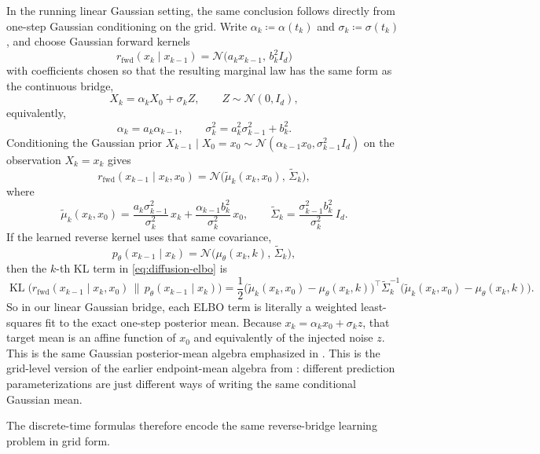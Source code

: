 In the running linear Gaussian setting, the same conclusion follows directly from one-step Gaussian conditioning on the grid.
Write \(\alpha_k\coloneqq \alpha(t_k)\) and \(\sigma_k\coloneqq \sigma(t_k)\), and choose Gaussian forward kernels
\[
  r_{\mathrm{fwd}}(x_k\mid x_{k-1})
  =
  \mathcal{N}\!\bigl(a_k x_{k-1},\,b_k^2 I_d\bigr)
\]
with coefficients chosen so that the resulting marginal law has the same form as the continuous bridge,
\[
  X_k=\alpha_k X_0+\sigma_k Z,
  \qquad
  Z\sim\mathcal{N}(0,I_d),
\]
equivalently,
\[
  \alpha_k=a_k\alpha_{k-1},
  \qquad
  \sigma_k^2=a_k^2\sigma_{k-1}^2+b_k^2.
\]
Conditioning the Gaussian prior \(X_{k-1}\mid X_0=x_0\sim \mathcal{N}(\alpha_{k-1}x_0,\sigma_{k-1}^2I_d)\) on the observation \(X_k=x_k\) gives
\[
  r_{\mathrm{fwd}}(x_{k-1}\mid x_k,x_0)
  =
  \mathcal{N}\!\bigl(\widetilde\mu_k(x_k,x_0),\,\widetilde\Sigma_k\bigr),
\]
where
\[
  \widetilde\mu_k(x_k,x_0)
  =
  \frac{a_k\sigma_{k-1}^2}{\sigma_k^2}\,x_k
  +
  \frac{\alpha_{k-1}b_k^2}{\sigma_k^2}\,x_0,
  \qquad
  \widetilde\Sigma_k
  =
  \frac{\sigma_{k-1}^2b_k^2}{\sigma_k^2}\,I_d.
\]
If the learned reverse kernel uses that same covariance,
\[
  p_\theta(x_{k-1}\mid x_k)
  =
  \mathcal{N}\!\bigl(\mu_\theta(x_k,k),\,\widetilde\Sigma_k\bigr),
\]
then the \(k\)-th KL term in \eqref{eq:diffusion-elbo} is
  \[
  \operatorname{KL}\!\bigl(
    r_{\mathrm{fwd}}(x_{k-1}\mid x_k,x_0)
    \,\|\,p_\theta(x_{k-1}\mid x_k)
  \bigr)
  =
  \frac{1}{2}
  \bigl(\widetilde\mu_k(x_k,x_0)-\mu_\theta(x_k,k)\bigr)^\top
  \widetilde\Sigma_k^{-1}
  \bigl(\widetilde\mu_k(x_k,x_0)-\mu_\theta(x_k,k)\bigr).
\]
So in our linear Gaussian bridge, each ELBO term is literally a weighted least-squares fit to the exact one-step posterior mean.
Because \(x_k=\alpha_k x_0+\sigma_k z\), that target mean is an affine function of \(x_0\) and equivalently of the injected noise \(z\).
This is the same Gaussian posterior-mean algebra emphasized in \citet[\S2.2.5, especially eq.~(2.2.11)]{lai_song_kim_mitsufuji_ermon_2025_principles_diffusion}.
This is the grid-level version of the earlier endpoint-mean algebra from : different prediction parameterizations are just different ways of writing the same conditional Gaussian mean.

The discrete-time formulas therefore encode the same reverse-bridge learning problem in grid form.
